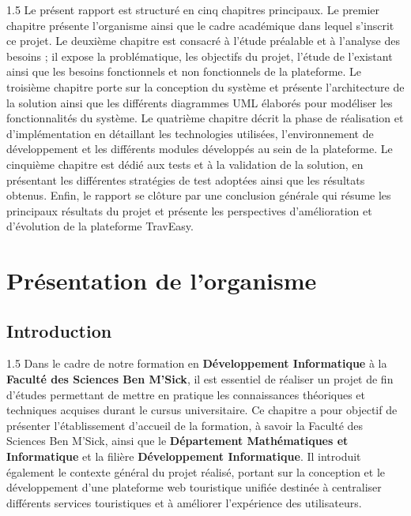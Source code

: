 \documentclass[a4paper,12pt]{report}
\begin{document}
\begin{spacing}{1.5}
Le présent rapport est structuré en cinq chapitres principaux. Le premier chapitre présente l'organisme ainsi que le cadre académique dans lequel s'inscrit ce projet. Le deuxième chapitre est consacré à l'étude préalable et à l'analyse des besoins ; il expose la problématique, les objectifs du projet, l'étude de l'existant ainsi que les besoins fonctionnels et non fonctionnels de la plateforme. Le troisième chapitre porte sur la conception du système et présente l'architecture de la solution ainsi que les différents diagrammes UML élaborés pour modéliser les fonctionnalités du système. Le quatrième chapitre décrit la phase de réalisation et d'implémentation en détaillant les technologies utilisées, l'environnement de développement et les différents modules développés au sein de la plateforme. Le cinquième chapitre est dédié aux tests et à la validation de la solution, en présentant les différentes stratégies de test adoptées ainsi que les résultats obtenus. Enfin, le rapport se clôture par une conclusion générale qui résume les principaux résultats du projet et présente les perspectives d'amélioration et d'évolution de la plateforme TravEasy.
\end{spacing}

\chapter{ Présentation de l'organisme}

\newpage
\section{Introduction}
\vspace{0.5cm}
\begin{spacing}{1.5}
\justifying
Dans le cadre de notre formation en \textbf{Développement Informatique} à la \textbf{Faculté des Sciences Ben M'Sick}, il est essentiel de réaliser un projet de fin d'études permettant de mettre en pratique les connaissances théoriques et techniques acquises durant le cursus universitaire. Ce chapitre a pour objectif de présenter l'établissement d'accueil de la formation, à savoir la Faculté des Sciences Ben M'Sick, ainsi que le \textbf{Département Mathématiques et Informatique} et la filière \textbf{Développement Informatique}. Il introduit également le contexte général du projet réalisé, portant sur la conception et le développement d'une plateforme web touristique unifiée destinée à centraliser différents services touristiques et à améliorer l'expérience des utilisateurs.

\end{spacing}
\end{document}
